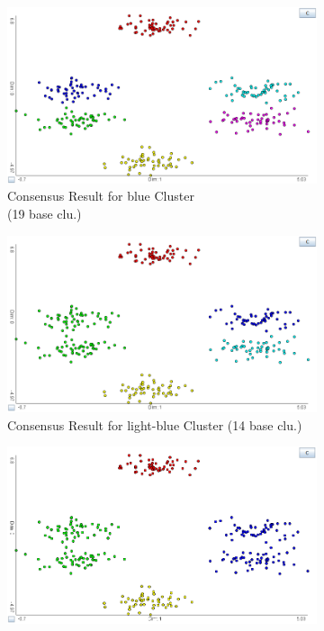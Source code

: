 \documentclass[
	a4paper,
	english,
	twoside,
	openright,               
	11pt                            
	]{report}
\begin{document}
\begin{figure}[h]
\centering
\begin{subfigure}[t]{.49\textwidth}
  \centering
  \includegraphics[width=.98\linewidth]{multi_c6}
  \caption{Consensus Result for blue Cluster\\(19 base clu.)}
  \label{fig:multi_c6}
\end{subfigure}
\hfill
\begin{subfigure}[t]{.49\textwidth}
  \centering
  \includegraphics[width=.98\linewidth]{multi_c5_2}
  \caption{Consensus Result for light-blue Cluster (14 base clu.)}
  \label{fig:multi_c5_2}
\end{subfigure}
\medskip
\begin{subfigure}[t]{.49\textwidth}
  \centering
  \includegraphics[width=.98\linewidth]{multi_c4}

\end{subfigure}
\end{figure}
\end{document}
